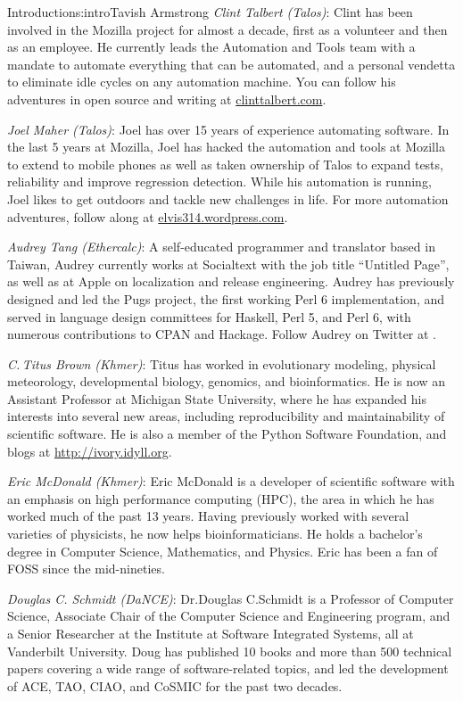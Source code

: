 \begin{aosachapter}{Introduction}{s:intro}{Tavish Armstrong}
\emph{Clint Talbert (Talos)}: Clint has been involved in the Mozilla project for almost a decade, first as a volunteer and then as an employee. He currently leads the Automation and Tools team with a mandate to automate everything that can be automated, and a personal vendetta to eliminate idle cycles on any automation machine. You can follow his adventures in open source and writing at \url{clinttalbert.com}.  

\emph{Joel Maher (Talos)}: Joel has over 15 years of experience automating software.  In the last 5 years at Mozilla, Joel has hacked the automation and tools at Mozilla to extend to mobile phones as well as taken ownership of Talos to expand tests, reliability and improve regression detection.  While his automation is running, Joel likes to get outdoors and tackle new challenges in life.  For more automation adventures, follow along at \url{elvis314.wordpress.com}.

\emph{Audrey Tang (Ethercalc)}: A self-educated programmer and translator based in Taiwan, Audrey currently works at Socialtext with the job title ``Untitled Page'', as well as at Apple on localization and release engineering. Audrey has previously designed and led the Pugs project, the first working Perl 6 implementation, and served in language design committees for Haskell, Perl 5, and Perl 6, with numerous contributions to CPAN and Hackage. Follow Audrey on Twitter at .


\emph{C.\,Titus Brown (Khmer)}: Titus has worked in evolutionary modeling, physical meteorology, developmental biology, genomics, and bioinformatics. He is now an Assistant Professor at Michigan State University, where he has expanded his interests into several new areas, including reproducibility and maintainability of scientific software. He is also a member of the Python Software Foundation, and blogs at \url{http://ivory.idyll.org}.

\emph{Eric McDonald (Khmer)}: Eric McDonald is a developer of scientific software with an emphasis on high performance computing (HPC), the area in which he has worked much of the past 13 years. Having previously worked with several varieties of physicists, he now helps  bioinformaticians. He holds a bachelor's degree in Computer Science, Mathematics, and Physics. Eric has been a fan of FOSS since the mid-nineties.

\emph{Douglas C. Schmidt (DaNCE)}: Dr.\@ Douglas C.\@ Schmidt is a Professor of Computer Science, Associate Chair of the Computer Science and Engineering program, and a Senior Researcher at the Institute at Software Integrated Systems, all at Vanderbilt University.  Doug has published 10 books and more than 500 technical papers covering a wide range of software-related topics, and led the development of ACE, TAO, CIAO, and CoSMIC for the past two decades.


\end{aosachapter}
